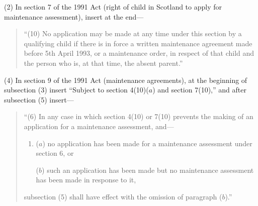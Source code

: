\documentclass[a4paper]{article}
\begin{document}
(2) In section 7 of the 1991 Act (right of child in Scotland to apply for maintenance assessment), insert at the end—
\begin{quotation}
“(10) No application may be made at any time under this section by a qualifying child if there is in force a written maintenance agreement made before 5th April 1993, or a maintenance order, in respect of that child and the person who is, at that time, the absent parent.”
\end{quotation}


(4) In section 9 of the 1991 Act (maintenance agreements), at the beginning of subsection (3) insert “Subject to section 4(10)($a$) and section 7(10),” and after subsection (5) insert—
\begin{quotation}
“(6) In any case in which section 4(10) or 7(10) prevents the making of an application for a maintenance assessment, and—
\begin{enumerate}\item[]
($a$) no application has been made for a maintenance assessment under section 6, or

($b$) such an application has been made but no maintenance assessment has been made in response to it,
\end{enumerate}
subsection (5) shall have effect with the omission of paragraph ($b$).”
\end{quotation}

\end{document}
